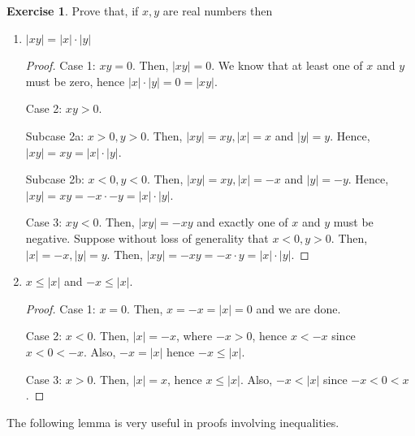 \documentclass[11pt]{article}
\theoremstyle{definition}
\newtheorem{exercise}[theorem]{Exercise}
\numberwithin{equation}{section}
\begin{document}
\begin{exercise} Prove that, if $x,y$ are real numbers then
\begin{enumerate}
\item[a)] $|xy|=|x|\cdot |y|$

\begin{proof}
Case 1: $xy = 0$. Then, $|xy|=0$. We know that at least one of $x$ and $y$ must be zero, hence $|x|\cdot |y|=0=|xy|$.

Case 2: $xy > 0$. 

Subcase 2a: $x> 0, y > 0$. Then, $|xy|=xy, |x|=x$ and $|y|=y$. Hence, $|xy|=xy=|x|\cdot |y|$. 

Subcase 2b: $x< 0, y < 0$. Then, $|xy|=xy, |x|=-x$ and $|y|=-y$. Hence, $|xy|=xy=-x\cdot -y=|x|\cdot |y|$. 

Case 3: $xy<0$. Then, $|xy|=-xy$ and exactly one of $x$ and $y$ must be negative. Suppose without loss of generality that $x<0,y>0$. Then, $|x|=-x, |y|=y$. Then, $|xy|=-xy=-x \cdot y=|x|\cdot |y|$.


\renewcommand\qedsymbol{QED}
\end{proof}

\item[b)] $x\leq |x|$ and $-x\leq |x|.$


\begin{proof}
Case 1: $x=0$. Then, $x=-x=|x|=0$ and we are done.

Case 2: $x<0$. Then, $|x|=-x$, where $-x>0$, hence $x < -x$ since $x<0<-x$. Also, $-x=|x|$ hence $-x \leq |x|$.

Case 3: $x>0$. Then, $|x|=x$, hence $x\leq |x|$. Also, $-x<|x|$ since $-x<0<x$. 


\renewcommand\qedsymbol{QED}
\end{proof}

\end{enumerate}
\end{exercise}

The following lemma is very useful in proofs involving inequalities.
\end{document}
